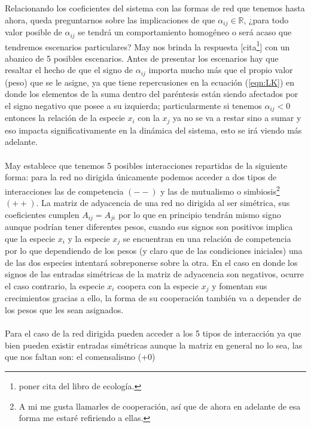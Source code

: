 \newpage
Relacionando los coeficientes del sistema con las formas de red que tenemos hasta ahora, queda preguntarnos sobre las implicaciones de que $\alpha_{ij}\in\mathbb{R}$, ¿para todo valor posible de $\alpha_{ij}$ se tendrá un comportamiento homogéneo o será acaso que tendremos escenarios particulares? May nos brinda la respuesta [cita\footnote{poner cita  del libro de ecología.}] con un abanico de 5 posibles escenarios. Antes de presentar los escenarios hay que resaltar el hecho de que el signo de $\alpha_{ij}$ importa mucho más que el propio valor (peso) que se le asigne, ya que tiene repercusiones en la ecuación (\ref{eqn:LK}) en donde los elementos de la suma dentro del paréntesis están siendo afectados por el signo negativo que posee a su izquierda; particularmente si tenemos $\alpha_{ij}<0$ entonces la relación de la especie $x_i$ con la $x_j$ ya no se va a restar sino a sumar y eso impacta significativamente en la dinámica del sistema, esto se irá viendo más adelante.\\
\\
May establece que tenemos 5 posibles interacciones repartidas de la siguiente forma: para la red no dirigida únicamente podemos acceder a dos tipos de interacciones las de competencia $(--)$ y las de mutualismo o simbiosis\footnote{A mi me gusta llamarles de cooperación, así que de ahora en adelante de esa forma me estaré refiriendo a ellas.} $(++)$. La matriz de adyacencia de una red no dirigida al ser simétrica, sus coeficientes cumplen $A_{ij}=A_{ji}$ por lo que en principio tendrán mismo signo aunque podrían tener diferentes pesos, cuando sus signos son positivos implica que la especie $x_i$ y la especie $x_j$ se encuentran en una relación de competencia por lo que dependiendo de los pesos (y claro que de las condiciones iniciales) una de las dos especies intentará sobreponerse sobre la otra. En el caso en donde los signos de las entradas simétricas de la matriz de adyacencia son negativos, ocurre el caso contrario, la especie $x_i$ coopera con la especie $x_j$ y fomentan sus crecimientos gracias a ello, la forma de su cooperación también va a depender de los pesos que les sean asignados.\\
\\
Para el caso de la red dirigida pueden acceder a los 5 tipos de interacción ya que bien pueden existir entradas simétricas aunque la matriz en general no lo sea, las que nos faltan son: el comensalismo (+0)


